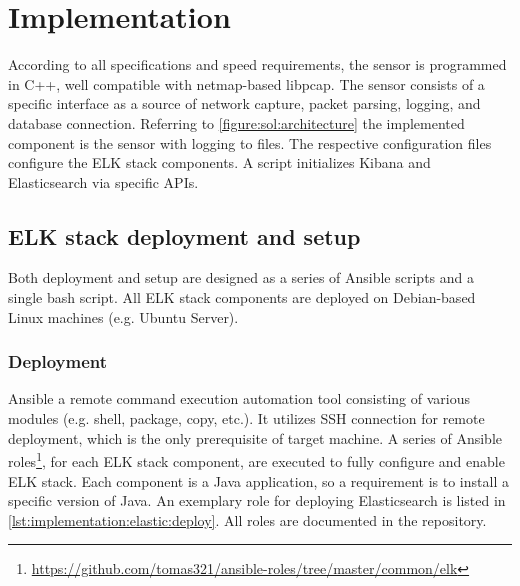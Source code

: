 \documentclass[12pt,a4paper,twoside]{book}
\begin{document}
\chapter{Implementation} \label{implementation}
    According to all specifications and speed requirements, the sensor is programmed in C++, well compatible with netmap-based libpcap. The sensor consists of a specific interface as a source of network capture, packet parsing, logging, and database connection. Referring to \autoref{figure:sol:architecture} the implemented component is the sensor with logging to files. The respective configuration files configure the ELK stack components. A script initializes Kibana and Elasticsearch via specific APIs.
    \section{ELK stack deployment and setup} \label{implementation:elk}
        Both deployment and setup are designed as a series of Ansible scripts and a single bash script. All ELK stack components are deployed on Debian-based Linux machines (e.g. Ubuntu Server).
        \subsection{Deployment} \label{implementation:elk:deploy}
            Ansible a remote command execution automation tool consisting of various modules (e.g. shell, package, copy, etc.). It utilizes SSH connection for remote deployment, which is the only prerequisite of target machine. A series of Ansible roles\footnote{\url{https://github.com/tomas321/ansible-roles/tree/master/common/elk}}, for each ELK stack component, are executed to fully configure and enable ELK stack. Each component is a Java application, so a requirement is to install a specific version of Java. An exemplary role for deploying Elasticsearch is listed in \autoref{lst:implementation:elastic:deploy}. All roles are documented in the repository.
            
\end{document}
